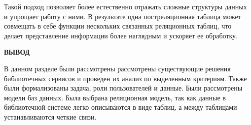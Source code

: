 Такой подход позволяет более естественно отражать сложные структуры данных и упрощает работу с ними. В результате одна постреляционная таблица может совмещать в себе функции нескольких связанных реляционных таблиц, что делает представление информации более наглядным и ускоряет ее обработку.

\textbf{ВЫВОД}

В данном разделе были рассмотрены рассмотрены существующие решения библиотечных сервисов и проведен их анализ по выделенным критериям. Также были формализованы задача, роли пользователей и данные. Были рассмотрены модели баз данных. Была выбрана реляционная модель, так как данные в библиотечной системе легко описываются в виде таблиц, а между таблицами устанавливаются четкие связи.
